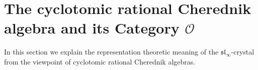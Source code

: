 \documentclass[12pt]{amsart}
\numberwithin{equation}{section}
\theoremstyle{definition}
\newcommand{\oh}{\mathcal{O}}
\newcommand{\slinf}{\mathfrak{sl}_\infty}
\begin{document}





\section{The cyclotomic rational Cherednik algebra and its Category $\oh$}\label{rca}
 In this section we explain the representation theoretic meaning of the $\slinf$-crystal from the viewpoint of cyclotomic rational Cherednik algebras.
 
\end{document}

